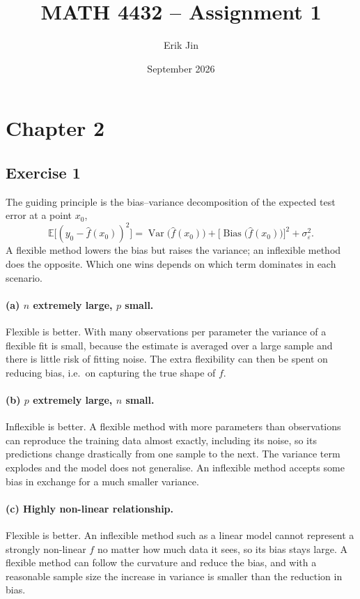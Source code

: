 \documentclass[11pt]{article}
\title{MATH 4432 -- Assignment 1}
\author{Erik Jin}
\date{September 2026}
\begin{document}
\maketitle

\section*{Chapter 2}

\subsection*{Exercise 1}

The guiding principle is the bias--variance decomposition of the expected test error at a point $x_0$,
\begin{equation*}
  \mathbb{E}\bigl[(y_0 - \hat f(x_0))^2\bigr]
  = \operatorname{Var}\bigl(\hat f(x_0)\bigr) + \bigl[\operatorname{Bias}\bigl(\hat f(x_0)\bigr)\bigr]^2 + \sigma_\varepsilon^2 .
\end{equation*}
A flexible method lowers the bias but raises the variance; an inflexible method does the opposite. Which one wins depends on which term dominates in each scenario.

\paragraph{(a) $n$ extremely large, $p$ small.}
Flexible is better. With many observations per parameter the variance of a flexible fit is small, because the estimate is averaged over a large sample and there is little risk of fitting noise. The extra flexibility can then be spent on reducing bias, i.e.\ on capturing the true shape of $f$.

\paragraph{(b) $p$ extremely large, $n$ small.}
Inflexible is better. A flexible method with more parameters than observations can reproduce the training data almost exactly, including its noise, so its predictions change drastically from one sample to the next. The variance term explodes and the model does not generalise. An inflexible method accepts some bias in exchange for a much smaller variance.

\paragraph{(c) Highly non-linear relationship.}
Flexible is better. An inflexible method such as a linear model cannot represent a strongly non-linear $f$ no matter how much data it sees, so its bias stays large. A flexible method can follow the curvature and reduce the bias, and with a reasonable sample size the increase in variance is smaller than the reduction in bias.
\end{document}
